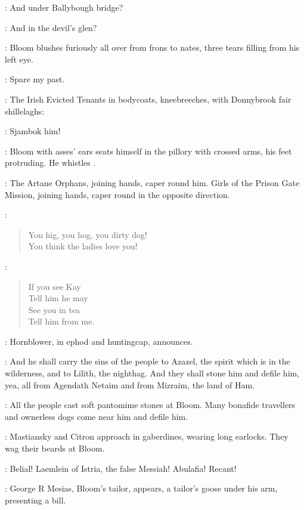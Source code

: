 \FemaleInfant:
And under Ballybough bridge?

\Hollybush:
And in the devil's glen?

:
Bloom blushes furiously all over from frons to nates,
three tears filling from his left eye.

\Bloom:
Spare my past.

:
The Irish Evicted Tenants in bodycoats, kneebreeches,
with Donnybrook fair shillelaghs:

\EvictedTenants:
Sjambok him!

:
Bloom with asses' ears seats himself in the pillory with crossed arms,
his feet protruding.
He whistles .

:
The Artane Orphans, joining hands, caper round him.
Girls of the Prison Gate Mission, joining hands,
caper round in the opposite direction.

\ArtaneOrphans:
\begin{verse}
%
    You hig, you hog, you dirty dog!\\
    You think the ladies love you!
\end{verse}

\PrisonGateGirls[1]:
\begin{verse}
    If you see Kay\\
    Tell him he may\\
    See you in tea\\
    Tell him from me.
\end{verse}

:
Hornblower, in ephod and huntingcap, announces.

\Hornblower:
And he shall carry the sins of the people to Azazel,
the spirit which is in the wilderness,
and to Lilith, the nighthag.
And they shall stone him and defile him, yea,
all from Agendath Netaim and from Mizraim, the land of Ham.

:
All the people cast soft pantomime stones at Bloom.
Many bonafide travellers and ownerless dogs come near him and defile him.

:
Mastiansky and Citron approach in gaberdines, wearing long earlocks.
They wag their beards at Bloom.

\MastianskyCitron:
Belial!
Laemlein of Istria, the false Messiah!
Abulafia!
Recant!

:
George R Mesias, Bloom's tailor, appears,
a tailor's goose under his arm, presenting a bill.

